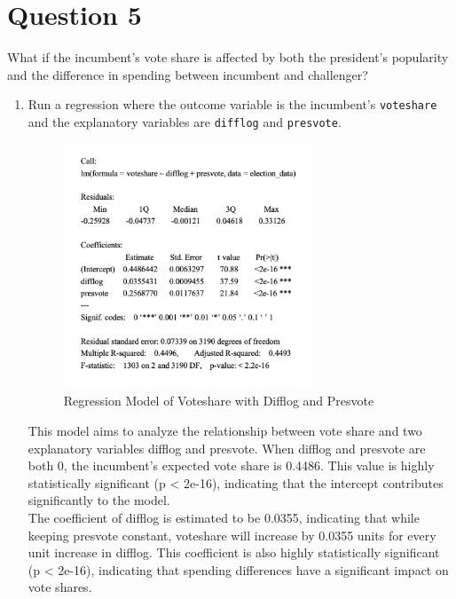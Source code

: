 \documentclass[12pt,letterpaper]{article}
\begin{document}
\section*{Question 5}
\noindent What if the incumbent's vote share is affected by both the president's popularity and the difference in spending between incumbent and challenger? 
	\begin{enumerate}
		\item Run a regression where the outcome variable is the incumbent's \texttt{voteshare} and the explanatory variables are \texttt{difflog} and \texttt{presvote}.	
		
		
	\begin{figure}[h!]
			\caption{\footnotesize{Regression Model of Voteshare with Difflog and Presvote}}
			\vspace{.5cm}
			\centering
			\label{fig:5.1}
			\includegraphics[width=0.7\textwidth]{summary5.png}
	\end{figure}
	\vspace{5cm}		
	This model aims to analyze the relationship between vote share and two explanatory variables difflog and presvote. When difflog and presvote are both 0, the incumbent's expected vote share is 0.4486. This value is highly statistically significant (p < 2e-16), indicating that the intercept contributes significantly to the model. \\
	The coefficient of difflog is estimated to be 0.0355, indicating that while keeping presvote constant, voteshare will increase by 0.0355 units for every unit increase in difflog. This coefficient is also highly statistically significant (p < 2e-16), indicating that spending differences have a significant impact on vote shares.\\

\end{enumerate}
\end{document}
